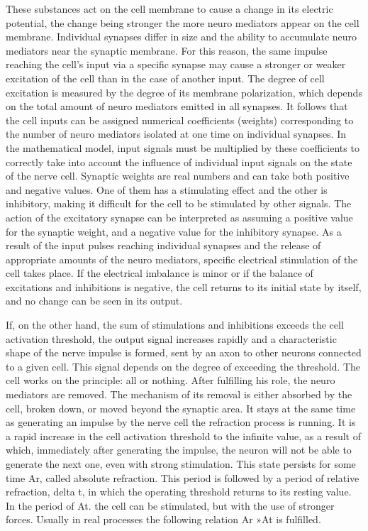 These substances act on the cell membrane to cause a change in its electric potential, 
the change being stronger the more neuro mediators appear on the cell membrane.
Individual synapses differ in size and the ability to accumulate neuro mediators near the synaptic
membrane. 
For this reason, the same impulse reaching the cell's input via a specific synapse may cause a
stronger or weaker excitation of the cell than in the case of another input.
The degree of cell excitation is measured by the degree of its membrane polarization,
which depends on the total amount of neuro mediators emitted in all synapses.
It follows that the cell inputs can be assigned numerical coefficients (weights) corresponding to 
the number of neuro mediators isolated at one time on individual synapses.
In the mathematical model, input signals must be multiplied by these coefficients to correctly 
take into account the influence of individual input signals on the state of the nerve cell.
Synaptic weights are real numbers and can take both positive and negative values.
One of them has a stimulating effect and the other is inhibitory, making it difficult for the cell
to be stimulated by other signals.
The action of the excitatory synapse can be interpreted as assuming a positive value for 
the synaptic weight, and a negative value for the inhibitory synapse.
As a result of the input pulses reaching individual synapses and the release of appropriate
amounts of the neuro mediators, specific electrical stimulation of the cell takes place.
If the electrical imbalance is minor or if the balance of excitations and inhibitions is negative,
the cell returns to its initial state by itself, and no change can be seen in its output.

If, on the other hand, the sum of stimulations and inhibitions exceeds the cell activation
threshold, the output signal increases rapidly and a characteristic shape of
the nerve impulse is formed, sent by an axon to other neurons connected to a given cell.
This signal depends on the degree of exceeding the threshold.
The cell works on the principle: all or nothing. After fulfilling his role, the neuro mediators
are removed. The mechanism of its removal is either absorbed by the cell,
broken down, or moved beyond the synaptic area.
It stays at the same time as generating an impulse by the nerve cell the refraction
process is running.
It is a rapid increase in the cell activation threshold to the infinite value, 
as a result of which, immediately after generating the impulse, the neuron will not be able 
to generate the next one, even with strong stimulation. This state persists for some time Ar,
called absolute refraction.
This period is followed by a period of relative refraction, delta t, in which the operating
threshold returns to its resting value. In the period of At.
the cell can be stimulated, but with the use of stronger forces.
Usually in real processes the following relation Ar »At is fulfilled.

